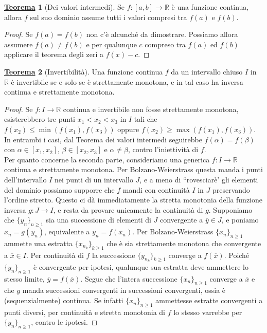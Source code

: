 \documentclass[a4paper,twoside]{article}
\newcommand{\R}{\mathbb{R}}
\theoremstyle{definition}
\newtheorem{theorem}{\color{Red}\underline{\textrm Teorema}}
\numberwithin{theorem}{section}
\begin{document}
\begin{theorem}[Dei valori intermedi]
Se $f:[a,b]\to \R$ è una funzione continua, allora $f$ sul suo dominio assume tutti i valori compresi tra $f(a)$ e $f(b)$.
\end{theorem}
\begin{proof}
Se $f(a)=f(b)$ non c'è alcunché da dimostrare. Possiamo allora assumere $f(a)\neq f(b)$ e per qualunque $c$ compreso tra $f(a)$ ed $f(b)$ applicare il teorema degli zeri a $f(x)-c$. 
\end{proof}


\begin{theorem}[Invertibilità]
Una funzione continua $f$ da un intervallo chiuso $I$ in $\R$ è invertibile se e solo se è strettamente monotona, e in tal caso ha inversa continua e strettamente monotona. 
\end{theorem}
\begin{proof}

Se $f:I\to \R$ continua e invertibile non fosse strettamente monotona, esisterebbero tre punti ${x_1<x_2<x_3}$ in $I$ tali che $f(x_2)\leq \min(f(x_1),f(x_3))$ oppure $f(x_2)\geq \max(f(x_1),f(x_3))$. In entrambi i casi, dal Teorema dei valori intermedi seguirebbe $f(\alpha)=f(\beta)$ con $\alpha\in[x_1,x_2]$, $\beta\in[x_2,x_3]$ e $\alpha\neq\beta$, contro l'iniettività di $f$.\\
Per quanto concerne la seconda parte, consideriamo una generica $f:I\to\mathbb{R}$ continua e strettamente monotona. Per Bolzano-Weierstrass questa manda i punti dell'intervallo $I$ nei punti di un intervallo $J$, e a meno di ``rovesciarè' gli elementi del dominio possiamo supporre che $f$ mandi con continuità $I$ in $J$ preservando l'ordine stretto. Questo ci dà immediatamente la stretta monotonia della funzione inversa $g:J\to I$, e resta da provare unicamente la continuità di $g$. Supponiamo che $\{y_n\}_{n\geq 1}$ sia una successione di elementi di $J$ convergente a $\overline{y}\in J$, e poniamo $x_n=g(y_n)$, equivalente a $y_n=f(x_n)$. Per Bolzano-Weierstrass $\{x_n\}_{n\geq 1}$ ammette una estratta $\{x_{n_k}\}_{k\geq 1}$ che è sia strettamente monotona che convergente a $\overline{x}\in I$. Per continuità di $f$ la successione $\{y_{n_k}\}_{k\geq 1}$ converge a $f(\overline{x})$. Poiché $\{y_n\}_{n\geq 1}$ è convergente per ipotesi, qualunque sua estratta deve ammettere lo stesso limite, $\overline{y}=f(\overline{x})$. Segue che l'intera successione $\{x_n\}_{n\geq 1}$ converge a $\overline{x}$ e che $g$ manda successioni convergenti in successioni convergenti, ossia è (sequenzialmente) continua. Se infatti $\{x_n\}_{n\geq 1}$ ammettesse estratte convergenti a punti diversi, per continuità e stretta monotonia di $f$ lo stesso varrebbe per $\{y_n\}_{n\geq 1}$, contro le ipotesi.
\end{proof}
\end{document}
